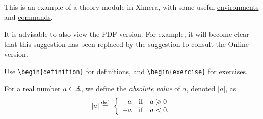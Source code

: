 \documentclass{ximera}
\begin{document}
    \author{Wim Obbels}
    \label{xim:ximeraDemo}

This is an example of a theory module in Ximera, 
with some useful \hyperref[xim:ximeraEnvironments]{environments} and \hyperref[xim:ximeraCommands]{commands}.



\begin{onlineOnly}
 \begin{remark}
    It is advisable to also view the PDF version. 
    For example, it will become clear that this suggestion has been replaced by the suggestion to consult the Online version.
 \end{remark}
\end{onlineOnly}



Use \verb|\begin{definition}| for definitions, and \verb|\begin{exercise}| for exercises.

\begin{definition}\label{showcase:absolutevalue}\nl 

	For a real number $a\in\mathbb{R}$, we define the \textit{absolute value} of $a$, denoted $|a|$, as
	\[
		|a| \perdef\displaystyle\ 
		          \left\{
			\begin{array}{rll  } 
				a  & \mbox{if} & a \geq 0 \\
				-a & \mbox{if} & a<0.
			\end{array}\right.
	\]
\end{definition}
\end{document}
